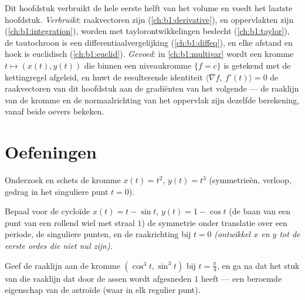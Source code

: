 \begin{remark}
\label{rem:b1:curves:perspectives}
Dit hoofdstuk verbruikt de hele eerste helft van het volume en
voedt het laatste hoofdstuk. \emph{Verbruikt}: raakvectoren zijn
 (\cref{ch:b1:derivative}),  en oppervlakten
zijn  (\cref{ch:b1:integration}),  worden met
taylorontwikkelingen beslecht (\cref{ch:b1:taylor}), de tautochroon
is een  differentiaalvergelijking (\cref{ch:b1:diffeq}), en
elke afstand en hoek is euclidisch (\cref{ch:b1:euclid}).
\emph{Gevoed}: in \cref{ch:b1:multivar} wordt een kromme $t \mapsto
(x(t), y(t))$ die binnen een niveaukromme $\{f = c\}$ is getekend
met de kettingregel afgeleid, en huwt de resulterende identiteit
$\langle \nabla f,\ f'(t)\rangle = 0$ de raakvectoren van dit
hoofdstuk aan de gradiënten van het volgende --- de raaklijn van
de kromme en de normaalrichting van het oppervlak zijn dezelfde
berekening, vanaf beide oevers bekeken.
\end{remark}

\section{Oefeningen}

\begin{exercise}[$\star$]\label{exo:b1:curves:1}
Onderzoek en schets de kromme $x(t) = t^2$, $y(t) = t^3$
(symmetrieën, verloop, gedrag in het singuliere punt $t = 0$).
\end{exercise}

\begin{exercise}[$\star$]\label{exo:b1:curves:2}
Bepaal voor de cycloïde $x(t) = t - \sin t$, $y(t) = 1 - \cos t$
(de baan van een punt van een rollend wiel met straal $1$) de
symmetrie onder translatie over een periode, de singuliere punten,
en de raakrichting bij $t = 0$ \emph{(ontwikkel $x$ en $y$ tot de
eerste ordes die niet nul zijn)}.
\end{exercise}

\begin{exercise}[$\star$]\label{exo:b1:curves:3}
Geef de raaklijn aan de kromme $(\cos^3 t, \sin^3 t)$ bij $t =
\frac\pi4$, en ga na dat het stuk van die raaklijn dat door de
assen wordt afgesneden  $1$ heeft --- een beroemde
eigenschap van de astroïde (waar in elk regulier punt).
\end{exercise}

